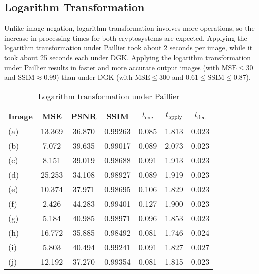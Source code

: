 \subsection{Logarithm Transformation}
Unlike image negation, logarithm transformation involves more operations, so the increase in processing times for both cryptosystems are expected. Applying the logarithm transformation under Paillier took about 2 seconds per image, while it took about 25 seconds each under DGK. Applying the logarithm transformation under Paillier results in faster and more accurate output images (with $\text{MSE} \le 30$ and $\text{SSIM} \approx 0.99$) than under DGK (with $\text{MSE} \le 300$ and $0.61 \le \text{SSIM} \le 0.87$).

\begin{table}[t]
	\centering
	\caption{Logarithm transformation under Paillier}
	\label{tbl:log-pal}
    \begin{tabular}{lcccccc}
        \hline
        Image & MSE  & PSNR & SSIM & $t_\text{enc}$ & $t_\text{apply}$ & $t_\text{dec}$ \\ \hline
		(a) & 13.369 & 36.870 & 0.99263 & 0.085 & 1.813 & 0.023 \\
		(b) & 7.072 & 39.635 & 0.99017 & 0.089 & 2.073 & 0.023 \\
		(c) & 8.151 & 39.019 & 0.98688 & 0.091 & 1.913 & 0.023 \\
		(d) & 25.253 & 34.108 & 0.98927 & 0.089 & 1.919 & 0.023 \\
		(e) & 10.374 & 37.971 & 0.98695 & 0.106 & 1.829 & 0.023 \\
		(f) & 2.426 & 44.283 & 0.99401 & 0.127 & 1.900 & 0.023 \\
		(g) & 5.184 & 40.985 & 0.98971 & 0.096 & 1.853 & 0.023 \\
		(h) & 16.772 & 35.885 & 0.98492 & 0.081 & 1.746 & 0.024 \\
		(i) & 5.803 & 40.494 & 0.99241 & 0.091 & 1.827 & 0.027 \\
		(j) & 12.192 & 37.270 & 0.99354 & 0.081 & 1.815 & 0.023 \\
		\hline
        \end{tabular}
\end{table}

